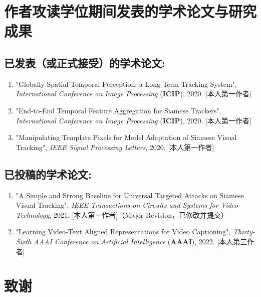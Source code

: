 \chapter{作者攻读学位期间发表的学术论文与研究成果}


\section*{已发表（或正式接受）的学术论文:}

{
\setlist[enumerate]{}%
\begin{enumerate}[nosep]
    \item "Globally Spatial-Temporal Perception: a Long-Term Tracking System", \textit{International Conference on Image Processing} (\textbf{ICIP}), 2020. [本人第一作者]
    \item "End-to-End Temporal Feature Aggregation for Siamese Trackers", \textit{International Conference on Image Processing} (\textbf{ICIP}), 2020. [本人第一作者]
    \item "Manipulating Template Pixels for Model Adaptation of Siamese Visual Tracking", \textit{IEEE Signal Processing Letters}, 2020. [本人第一作者]
\end{enumerate}
}

\section*{已投稿的学术论文:}

{
\setlist[enumerate]{}%
\begin{enumerate}[nosep]
    \item "A Simple and Strong Baseline for Universal Targeted Attacks on Siamese Visual Tracking", \textit{IEEE Transactions on Circuits and Systems for Video Technology}, 2021. [本人第一作者]（Major Revision，已修改并提交）
    \item "Learning Video-Text Aligned Representations for Video Captioning", \textit{Thirty-Sixth AAAI Conference on Artificial Intelligence} (\textbf{AAAI}), 2022. [本人第三作者]
\end{enumerate}
}

\chapter[致谢]{致\quad 谢}%
\thispagestyle{noheaderstyle}%

\cleardoublepage[plain]%
